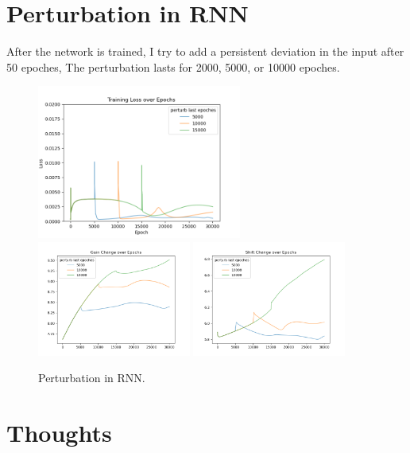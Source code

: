 \documentclass[12pt, a4paper]{article}
\begin{document}
\section*{Perturbation in RNN}

After the network is trained, I try to add a persistent deviation in the input after 50 epoches, The perturbation lasts for 2000, 5000, or 10000 epoches.

\begin{figure}[H]
    \centering
    \includegraphics[width=0.6\textwidth]{analysis/fig/0122_SIN2_perturb_loss.png} \\
    \includegraphics[width=0.45\textwidth]{analysis/fig/0122_SIN2_perturb_gc.png} 
    \includegraphics[width=0.45\textwidth]{analysis/fig/0122_SIN2_perturb_sc.png}
    \caption{Perturbation in RNN.}
\end{figure}

\section*{Thoughts}
\end{document}

